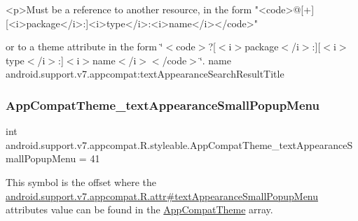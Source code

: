 \begin{DoxyVerb}      <p>Must be a reference to another resource, in the form "<code>@[+][<i>package</i>:]<i>type</i>:<i>name</i></code>"
\end{DoxyVerb}
 or to a theme attribute in the form \char`\"{}$<$code$>$?\mbox{[}$<$i$>$package$<$/i$>$\+:\mbox{]}\mbox{[}$<$i$>$type$<$/i$>$\+:\mbox{]}$<$i$>$name$<$/i$>$$<$/code$>$\char`\"{}.  name android.\+support.\+v7.\+appcompat\+:text\+Appearance\+Search\+Result\+Title \mbox{\label{classandroid_1_1support_1_1v7_1_1appcompat_1_1R_1_1styleable_a3954e911add56535f0dee6d29c451821}} 
\subsubsection{\texorpdfstring{App\+Compat\+Theme\+\_\+text\+Appearance\+Small\+Popup\+Menu}{AppCompatTheme\_textAppearanceSmallPopupMenu}}
{\footnotesize\ttfamily int android.\+support.\+v7.\+appcompat.\+R.\+styleable.\+App\+Compat\+Theme\+\_\+text\+Appearance\+Small\+Popup\+Menu = 41\hspace{0.3cm}{\ttfamily [static]}}

This symbol is the offset where the \hyperlink{classandroid_1_1support_1_1v7_1_1appcompat_1_1R_1_1attr_aac7d2624167851427132ba8fa60937f5}{android.\+support.\+v7.\+appcompat.\+R.\+attr\#text\+Appearance\+Small\+Popup\+Menu} attribute\textquotesingle{}s value can be found in the \hyperlink{classandroid_1_1support_1_1v7_1_1appcompat_1_1R_1_1styleable_a5c42f89e8a410c323be34208d75c430b}{App\+Compat\+Theme} array.


